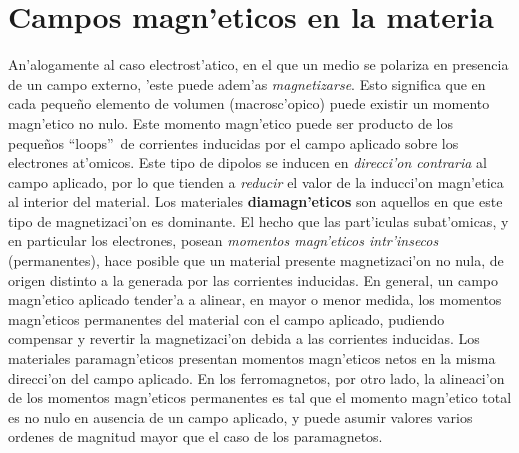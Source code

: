 \section{Campos magn'eticos en la materia}
An'alogamente al caso electrost'atico, en el que un medio se polariza en
presencia de un campo externo, 'este puede adem'as \textit{magnetizarse}. Esto
significa que en cada peque\~no elemento de volumen (macrosc'opico) puede existir un momento magn'etico no nulo. Este momento magn'etico puede ser producto de
los peque\~nos ``loops''\, de corrientes inducidas por el campo aplicado sobre los
electrones at'omicos. Este tipo de dipolos se inducen en \textit{direcci'on contraria}
al campo aplicado, por lo que tienden a \textit{reducir} el valor de la inducci'on
magn'etica al interior del material. Los materiales \textbf{diamagn'eticos} son aquellos en que este tipo de magnetizaci'on es dominante. El hecho que las
part'iculas subat'omicas, y en particular los electrones, posean \textit{momentos
magn'eticos intr'insecos} (permanentes), hace posible que un material presente
magnetizaci'on no nula, de origen distinto a la generada por las corrientes
inducidas. En general, un campo magn'etico aplicado tender'a a alinear, en
mayor o menor medida, los momentos magn'eticos permanentes del material con el campo aplicado, pudiendo compensar y revertir la magnetizaci'on debida a las corrientes
inducidas. Los materiales paramagn'eticos presentan momentos magn'eticos
netos en la misma direcci'on del campo aplicado. En los ferromagnetos, por
otro lado, la alineaci'on de los momentos magn'eticos permanentes es tal que el
momento magn'etico total es no nulo en ausencia de un campo aplicado, y puede asumir valores varios ordenes de magnitud mayor que el caso de los paramagnetos.

